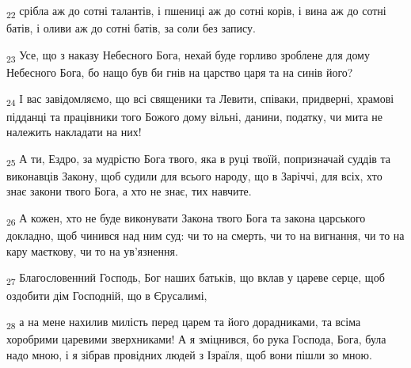 \begin{tcolorbox}
\textsubscript{22} срібла аж до сотні талантів, і пшениці аж до сотні корів, і вина аж до сотні батів, і оливи аж до сотні батів, за соли без запису.
\end{tcolorbox}
\begin{tcolorbox}
\textsubscript{23} Усе, що з наказу Небесного Бога, нехай буде горливо зроблене для дому Небесного Бога, бо нащо був би гнів на царство царя та на синів його?
\end{tcolorbox}
\begin{tcolorbox}
\textsubscript{24} І вас завідомляємо, що всі священики та Левити, співаки, придверні, храмові підданці та працівники того Божого дому вільні, данини, податку, чи мита не належить накладати на них!
\end{tcolorbox}
\begin{tcolorbox}
\textsubscript{25} А ти, Ездро, за мудрістю Бога твого, яка в руці твоїй, попризначай суддів та виконавців Закону, щоб судили для всього народу, що в Заріччі, для всіх, хто знає закони твого Бога, а хто не знає, тих навчите.
\end{tcolorbox}
\begin{tcolorbox}
\textsubscript{26} А кожен, хто не буде виконувати Закона твого Бога та закона царського докладно, щоб чинився над ним суд: чи то на смерть, чи то на вигнання, чи то на кару маєткову, чи то на ув'язнення.
\end{tcolorbox}
\begin{tcolorbox}
\textsubscript{27} Благословенний Господь, Бог наших батьків, що вклав у цареве серце, щоб оздобити дім Господній, що в Єрусалимі,
\end{tcolorbox}
\begin{tcolorbox}
\textsubscript{28} а на мене нахилив милість перед царем та його дорадниками, та всіма хоробрими царевими зверхниками! А я зміцнився, бо рука Господа, Бога, була надо мною, і я зібрав провідних людей з Ізраїля, щоб вони пішли зо мною.
\end{tcolorbox}
